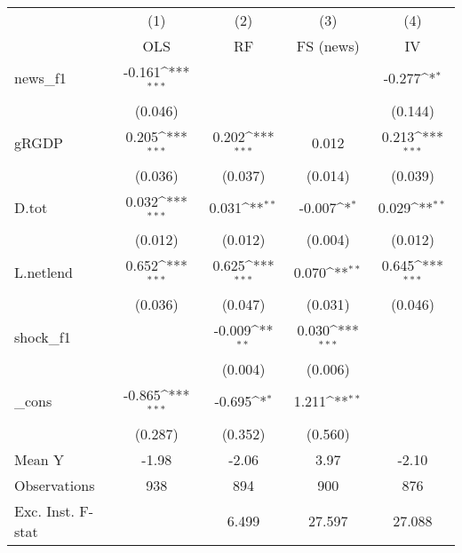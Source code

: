 {
\def\sym#1{\ifmmode^{#1}\else\(^{#1}\)\fi}
\begin{tabular}{l*{4}{c}}
\toprule
            &\multicolumn{1}{c}{(1)}&\multicolumn{1}{c}{(2)}&\multicolumn{1}{c}{(3)}&\multicolumn{1}{c}{(4)}\\
            &\multicolumn{1}{c}{OLS}&\multicolumn{1}{c}{RF}&\multicolumn{1}{c}{FS (news)}&\multicolumn{1}{c}{IV}\\
\midrule
news\_f1     &      -0.161\sym{***}&                     &                     &      -0.277\sym{*}  \\
            &     (0.046)         &                     &                     &     (0.144)         \\
\addlinespace
gRGDP       &       0.205\sym{***}&       0.202\sym{***}&       0.012         &       0.213\sym{***}\\
            &     (0.036)         &     (0.037)         &     (0.014)         &     (0.039)         \\
\addlinespace
D.tot       &       0.032\sym{***}&       0.031\sym{**} &      -0.007\sym{*}  &       0.029\sym{**} \\
            &     (0.012)         &     (0.012)         &     (0.004)         &     (0.012)         \\
\addlinespace
L.netlend   &       0.652\sym{***}&       0.625\sym{***}&       0.070\sym{**} &       0.645\sym{***}\\
            &     (0.036)         &     (0.047)         &     (0.031)         &     (0.046)         \\
\addlinespace
shock\_f1    &                     &      -0.009\sym{**} &       0.030\sym{***}&                     \\
            &                     &     (0.004)         &     (0.006)         &                     \\
\addlinespace
\_cons      &      -0.865\sym{***}&      -0.695\sym{*}  &       1.211\sym{**} &                     \\
            &     (0.287)         &     (0.352)         &     (0.560)         &                     \\
\midrule
Mean Y      &       -1.98         &       -2.06         &        3.97         &       -2.10         \\
Observations&         938         &         894         &         900         &         876         \\
Exc. Inst. F-stat&                     &       6.499         &      27.597         &      27.088         \\
\bottomrule
\end{tabular}
}
